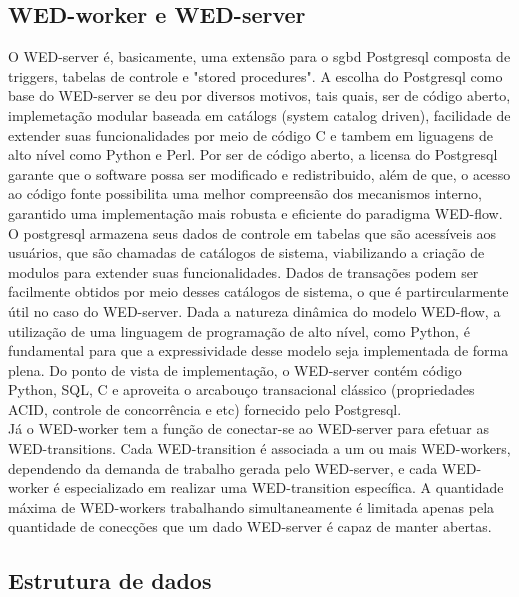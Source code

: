 \documentclass[conference]{IEEEtran}
\begin{document}
\subsection{WED-worker e WED-server}
O WED-server é, basicamente, uma extensão para o sgbd Postgresql composta de triggers, tabelas de controle e "stored
procedures". A escolha do Postgresql como base do WED-server se deu por diversos motivos, tais quais, ser de código aberto, 
implemetação modular baseada em catálogs (system catalog driven), facilidade de extender suas funcionalidades por meio de
código C e tambem em liguagens de alto nível como Python e Perl. Por ser de código aberto, a licensa do Postgresql garante
que o software possa ser modificado e redistribuido, além de que, o acesso ao código fonte possibilita uma melhor compreensão
dos mecanismos interno, garantido uma implementação mais robusta e eficiente do paradigma WED-flow. O postgresql armazena seus
dados de controle em tabelas que são acessíveis aos usuários, que são chamadas de catálogos de sistema, viabilizando a 
criação de modulos para extender suas funcionalidades. Dados de transações podem ser facilmente obtidos por meio desses 
catálogos de sistema, o que é partircularmente útil no caso do WED-server. Dada a natureza dinâmica do modelo WED-flow,
a utilização de uma linguagem de programação de alto nível, como Python, é fundamental para que a expressividade desse
modelo seja implementada de forma plena. Do ponto de vista de implementação, o WED-server contém código Python, SQL, C e 
aproveita o arcabouço transacional clássico (propriedades ACID, controle de concorrência e etc) fornecido pelo Postgresql.
\\
\indent Já o WED-worker tem a função de conectar-se ao WED-server para efetuar as WED-transitions. Cada WED-transition é 
associada a um ou mais WED-workers, dependendo da demanda de trabalho gerada pelo WED-server, e cada WED-worker é especializado
em realizar uma WED-transition específica. A quantidade máxima de WED-workers trabalhando simultaneamente é limitada
apenas pela quantidade de conecções que um dado WED-server é capaz de manter abertas.

\subsection{Estrutura de dados}
\end{document}
